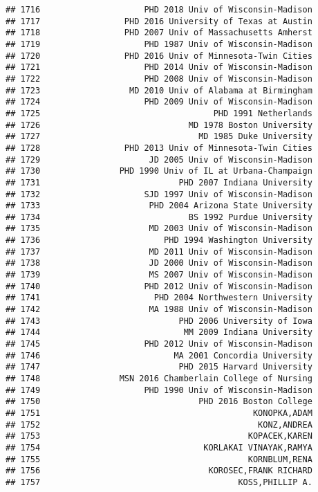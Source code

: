 \documentclass[
]{article}
\begin{document}
\begin{verbatim}
## 1716                     PHD 2018 Univ of Wisconsin-Madison
## 1717                 PHD 2016 University of Texas at Austin
## 1718                 PHD 2007 Univ of Massachusetts Amherst
## 1719                     PHD 1987 Univ of Wisconsin-Madison
## 1720                 PHD 2016 Univ of Minnesota-Twin Cities
## 1721                     PHD 2014 Univ of Wisconsin-Madison
## 1722                     PHD 2008 Univ of Wisconsin-Madison
## 1723                  MD 2010 Univ of Alabama at Birmingham
## 1724                     PHD 2009 Univ of Wisconsin-Madison
## 1725                                   PHD 1991 Netherlands
## 1726                              MD 1978 Boston University
## 1727                                MD 1985 Duke University
## 1728                 PHD 2013 Univ of Minnesota-Twin Cities
## 1729                      JD 2005 Univ of Wisconsin-Madison
## 1730                PHD 1990 Univ of IL at Urbana-Champaign
## 1731                            PHD 2007 Indiana University
## 1732                     SJD 1997 Univ of Wisconsin-Madison
## 1733                      PHD 2004 Arizona State University
## 1734                              BS 1992 Purdue University
## 1735                      MD 2003 Univ of Wisconsin-Madison
## 1736                         PHD 1994 Washington University
## 1737                      MD 2011 Univ of Wisconsin-Madison
## 1738                      JD 2000 Univ of Wisconsin-Madison
## 1739                      MS 2007 Univ of Wisconsin-Madison
## 1740                     PHD 2012 Univ of Wisconsin-Madison
## 1741                       PHD 2004 Northwestern University
## 1742                      MA 1988 Univ of Wisconsin-Madison
## 1743                            PHD 2006 University of Iowa
## 1744                             MM 2009 Indiana University
## 1745                     PHD 2012 Univ of Wisconsin-Madison
## 1746                           MA 2001 Concordia University
## 1747                            PHD 2015 Harvard University
## 1748                MSN 2016 Chamberlain College of Nursing
## 1749                     PHD 1990 Univ of Wisconsin-Madison
## 1750                                PHD 2016 Boston College
## 1751                                           KONOPKA,ADAM
## 1752                                            KONZ,ANDREA
## 1753                                          KOPACEK,KAREN
## 1754                                 KORLAKAI VINAYAK,RAMYA
## 1755                                          KORNBLUM,RENA
## 1756                                  KOROSEC,FRANK RICHARD
## 1757                                        KOSS,PHILLIP A.

\end{verbatim}
\end{document}
